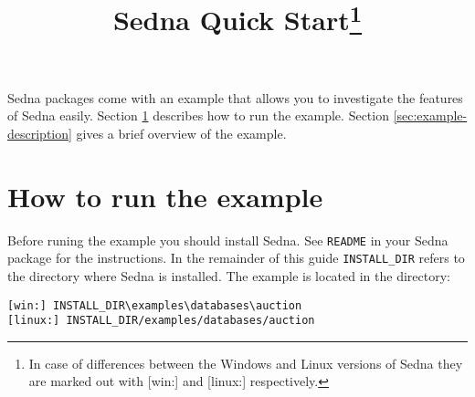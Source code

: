 \documentclass[a4paper,12pt]{article}
\title{Sedna Quick Start\footnote{In case of differences between the Windows and Linux versions of Sedna they are marked out with [win:] and [linux:] respectively.}}
\date{}
\begin{document}
\sloppy

\maketitle

Sedna packages come with an example that allows you to investigate the features of Sedna easily. 
Section \ref{sec:how-to-run} describes how to run the example. Section \ref{sec:example-description} gives a brief overview of the example.

\section{How to run the example}
\label{sec:how-to-run}
Before runing the example you should install Sedna. See \verb!README! in your Sedna package for the instructions.
In the remainder of this guide \verb!INSTALL_DIR! refers to the directory where Sedna is installed.  
The example is located in the directory:

\begin{verbatim}
[win:] INSTALL_DIR\examples\databases\auction
[linux:] INSTALL_DIR/examples/databases/auction
\end{verbatim}
\end{document}
